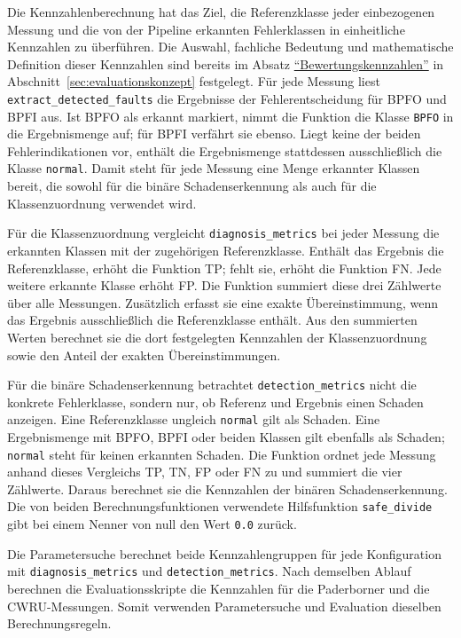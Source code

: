 \label{subsec:kennzahlen_impl}


Die Kennzahlenberechnung hat das Ziel, die Referenzklasse jeder einbezogenen
Messung und die von der Pipeline erkannten Fehlerklassen in einheitliche
Kennzahlen zu überführen. Die Auswahl, fachliche Bedeutung und mathematische
Definition dieser Kennzahlen
sind bereits im Absatz
\hyperref[sec:evaluationskonzept]{\enquote{Bewertungskennzahlen}} in
Abschnitt~\ref{sec:evaluationskonzept} festgelegt. Für jede Messung liest
\texttt{extract\_\allowbreak detected\_\allowbreak faults} die Ergebnisse der
Fehlerentscheidung für BPFO und BPFI aus. Ist BPFO als erkannt markiert, nimmt
die Funktion die Klasse \texttt{BPFO} in die Ergebnismenge auf; für BPFI
verfährt sie ebenso. Liegt keine der beiden Fehlerindikationen vor, enthält die
Ergebnismenge stattdessen ausschließlich die Klasse \texttt{normal}. Damit
steht für jede Messung eine Menge erkannter Klassen bereit, die sowohl für die
binäre Schadenserkennung als auch für die Klassenzuordnung verwendet wird.

Für die Klassenzuordnung vergleicht \texttt{diagnosis\_metrics} bei jeder
Messung die erkannten Klassen mit der zugehörigen Referenzklasse. Enthält das
Ergebnis die Referenzklasse, erhöht die Funktion \gls{TP}; fehlt sie, erhöht
die Funktion \gls{FN}. Jede weitere erkannte Klasse erhöht \gls{FP}. Die
Funktion summiert diese drei Zählwerte über alle Messungen. Zusätzlich erfasst
sie eine exakte Übereinstimmung, wenn das Ergebnis ausschließlich die
Referenzklasse enthält. Aus den summierten Werten berechnet sie die dort
festgelegten Kennzahlen der Klassenzuordnung sowie den Anteil der exakten
Übereinstimmungen.

Für die binäre Schadenserkennung betrachtet \texttt{detection\_metrics} nicht
die konkrete Fehlerklasse, sondern nur, ob Referenz und Ergebnis einen Schaden
anzeigen. Eine Referenzklasse ungleich \texttt{normal} gilt als Schaden. Eine
Ergebnismenge mit BPFO, BPFI oder beiden Klassen gilt ebenfalls als Schaden;
\texttt{normal} steht für keinen erkannten Schaden. Die Funktion ordnet jede
Messung anhand dieses Vergleichs \gls{TP}, \gls{TN}, \gls{FP} oder \gls{FN}
zu und summiert die vier Zählwerte. Daraus berechnet sie die Kennzahlen der
binären Schadenserkennung. Die von beiden Berechnungsfunktionen verwendete
Hilfsfunktion \texttt{safe\_divide} gibt bei einem Nenner von null den Wert
\texttt{0.0} zurück.

Die Parametersuche berechnet beide Kennzahlengruppen für jede Konfiguration
mit \texttt{diagnosis\_\allowbreak metrics} und
\texttt{detection\_\allowbreak metrics}. Nach demselben Ablauf berechnen die
Evaluationsskripte die Kennzahlen für die Paderborner und die CWRU-Messungen.
Somit verwenden Parametersuche und Evaluation dieselben Berechnungsregeln.

